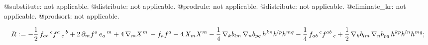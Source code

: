 \documentclass[11pt]{article}
\def\specialcolon{\mathrel{\mathop{:}}\hspace{-.5em}}
\begin{document}
@substitute: not applicable.
@distribute: not applicable.
@prodrule: not applicable.
@distribute: not applicable.
@eliminate\_kr: not applicable.
@prodsort: not applicable.


\begin{dmath*}[compact, spread=2pt]
R\specialcolon{}=  - \frac{1}{2}\, {f}_{a b}\,^{c} {f}^{a}\,_{c}\,^{b} + 2\, {\partial}_{m}{{f}^{a}}\,  {e}_{a}\,^{m} + 4\, {\nabla}_{m}{{X}^{m}}\,  - {f}_{a} {f}^{a} - 4\, {X}_{m} {X}^{m} - \frac{1}{4}\, {\nabla}_{k}{{b}_{l m}}\,  {\nabla}_{n}{{b}_{p q}}\,  {h}^{k n} {h}^{l p} {h}^{m q} - \frac{1}{4}\, {f}_{a b}\,^{c} {f}^{a b}\,_{c} + \frac{1}{2}\, {\nabla}_{k}{{b}_{l m}}\,  {\nabla}_{n}{{b}_{p q}}\,  {h}^{k p} {h}^{l n} {h}^{m q};
\end{dmath*}
\end{document}

